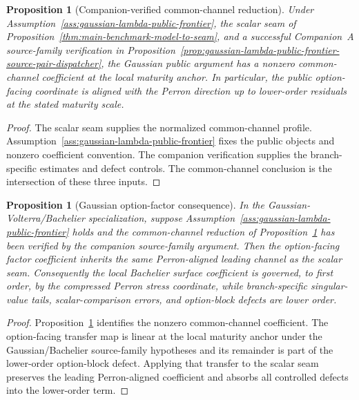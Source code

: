 \documentclass[11pt,a4paper]{amsart}
\theoremstyle{plain}
\newtheorem{proposition}[theorem]{Proposition}
\theoremstyle{definition}
\theoremstyle{remark}
\begin{document}
\begin{proposition}[Companion-verified common-channel reduction]\label{thm:main-common-channel-headline}
Under Assumption~\ref{ass:gaussian-lambda-public-frontier}, the scalar seam of
Proposition~\ref{thm:main-benchmark-model-to-seam}, and a successful Companion~A source-family verification in
Proposition~\ref{prop:gaussian-lambda-public-frontier-source-pair-dispatcher}, the Gaussian public
argument has a nonzero common-channel coefficient at the local maturity anchor.  In particular, the
public option-facing coordinate is aligned with the Perron direction up to lower-order
residuals at the stated maturity scale.
\end{proposition}

\begin{proof}
The scalar seam supplies the normalized common-channel profile.  Assumption~\ref{ass:gaussian-lambda-public-frontier} fixes the
public objects and nonzero coefficient convention.  The companion verification supplies the
branch-specific estimates and defect controls.  The common-channel conclusion is the intersection of these three inputs.
\end{proof}


\begin{proposition}[Gaussian option-factor consequence]\label{thm:main-gaussian-option-factor}
In the Gaussian-Volterra/Bachelier specialization, suppose Assumption~\ref{ass:gaussian-lambda-public-frontier}
holds and the common-channel reduction of Proposition~\ref{thm:main-common-channel-headline}
has been verified by the companion source-family argument.  Then the option-facing factor coefficient inherits the same
Perron-aligned leading channel as the scalar seam.  Consequently the local Bachelier surface
coefficient is governed, to first order, by the compressed Perron stress coordinate, while
branch-specific singular-value tails, scalar-comparison errors, and option-block defects are lower
order.
\end{proposition}

\begin{proof}
Proposition~\ref{thm:main-common-channel-headline} identifies the nonzero common-channel coefficient.
The option-facing transfer map is linear at the local maturity anchor under the Gaussian/Bachelier
source-family hypotheses and its remainder is part of the lower-order option-block defect.  Applying that
transfer to the scalar seam preserves the leading Perron-aligned coefficient and absorbs all
controlled defects into the lower-order term.
\end{proof}
\end{document}
